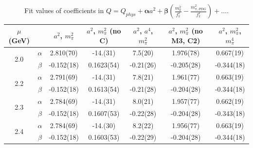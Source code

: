 \documentclass[12pt]{extarticle}
\begin{document}
\begin{table}[h!]
\begin{center}
\begin{tabular}{|c c|c|c|c|c|c|}
\hline
$\mu$ (GeV) &  & $a^2$, $m_\pi^2$& $a^2$, $m_\pi^2$ (no C)& $a^2$, $a^4$, $m_\pi^2$& $a^2$, $m_\pi^2$ (no M3, C2)& $a^2$, $m_\pi^2$, $m_\pi^4$\\
\hline
\multirow{2}{0.5in}{2.0} & $\alpha$ & 2.810(70)& -14.(31)& 7.5(20)& 1.976(78)& 0.667(19)\\
 & $\beta$ & -0.152(18)& 0.1623(54)& -0.21(26)& -0.205(28)& -0.344(18)\\
\hline
\multirow{2}{0.5in}{2.2} & $\alpha$ & 2.791(69)& -14.(31)& 7.8(21)& 1.961(77)& 0.663(19)\\
 & $\beta$ & -0.152(18)& 0.1613(54)& -0.21(28)& -0.204(28)& -0.344(18)\\
\hline
\multirow{2}{0.5in}{2.3} & $\alpha$ & 2.784(69)& -14.(31)& 8.0(21)& 1.957(77)& 0.662(19)\\
 & $\beta$ & -0.152(18)& 0.1607(53)& -0.22(28)& -0.204(28)& -0.343(18)\\
\hline
\multirow{2}{0.5in}{2.4} & $\alpha$ & 2.784(69)& -14.(30)& 8.2(22)& 1.956(77)& 0.663(19)\\
 & $\beta$ & -0.152(18)& 0.1603(53)& -0.22(29)& -0.204(28)& -0.344(18)\\
\hline
\end{tabular}
\caption{Fit values of coefficients in $Q = Q_{phys} + \mathbf{\alpha} a^2 + \mathbf{\beta}\left(\frac{m_\pi^2}{f_\pi^2}-\frac{m_{\pi,PDG}^2}{f_\pi^2}\right) + \ldots$.}
\end{center}
\end{table}




















\clearpage
\end{document}
